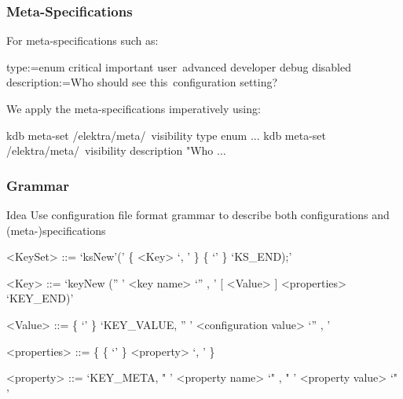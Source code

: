 \begin{frame}[fragile]
	\frametitle{Meta-Specifications}
	For meta-specifications such as:

	\small
	\begin{code}
	[visibility]
	type:=enum critical important user\
	      advanced developer debug disabled
	description:=Who should see this\
	     configuration setting?
	\end{code}

	\vspace{1cm}

	We apply the meta-specifications imperatively using:

	\begin{code}[language=bash,morekeywords={meta-set}]
	kdb meta-set /elektra/meta/\
		visibility type enum ...
	kdb meta-set /elektra/meta/\
		visibility description "Who ...
	\end{code}
\end{frame}


\begin{frame}[fragile]
	\frametitle{Grammar}
	\begin{alertblock}{Idea}
	Use configuration file format grammar to describe both configurations and (meta-)specifications
	\end{alertblock}

	\begin{grammar}
	<KeySet> ::= \lq ksNew'\WhiteSpace(' \{ <Key> \lq , \LineBreak'  \}  \{ \lq\WhiteSpace' \} \lq KS\_END);'

	<Key> ::= \lq keyNew \WhiteSpace ('' ' <key name> \lq ''  , \LineBreak' [ <Value> ] <properties> \lq KEY_END)'

	<Value> ::=  \{ \lq\WhiteSpace' \} \lq KEY\_VALUE, \WhiteSpace '' ' <configuration value> \lq ''  , \LineBreak'

	<properties> ::= \{ \{ \lq\WhiteSpace' \} <property> \lq , \LineBreak' \}

	<property> ::=  \lq KEY\_META, \WhiteSpace " ' <property name> \lq "  , \WhiteSpace " ' <property value> \lq " '
	\end{grammar}
\end{frame}

